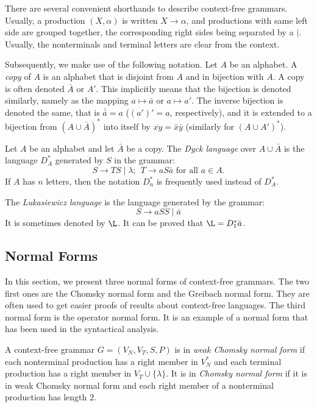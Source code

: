 There are several convenient shorthands to describe context-free grammars. Usually, a production $(X, \alpha)$ is written $X \to \alpha$, and productions with same left side are grouped together, the corresponding right sides being separated by a $\mid$. Usually, the nonterminals and terminal letters are clear from the context.

Subsequently, we make use of the following notation. Let $A$ be an alphabet. A \emph{copy} of $A$ is an alphabet that is disjoint from $A$ and in bijection with $A$. A copy is often denoted $\bar{A}$ or $A'$. This implicitly means that the bijection is denoted similarly, namely as the mapping $a \mapsto \bar{a}$ or $a \mapsto a'$. The inverse bijection is denoted the same, that is $\bar{\bar{a}} = a$ ($(a')' = a$, respectively), and it is extended to a bijection from $(A \cup \bar{A})^*$ into itself  by $\overline{xy} = \bar{x} \bar{y}$ (similarly for $(A \cup A')^*$).

Let $A$ be an alphabet and let $\bar{A}$ be a copy. The \emph{Dyck language} over $A \cup \bar{A}$ is the language $D^*_A$ generated by $S$ in the grammar: $$S \to TS \mid \lambda; \ \ T \to a S \bar{a} \text{ for all } a \in A.$$ If $A$ has $n$ letters, then the notation $D^*_n$ is frequently used instead of $D^*_A$.

The \emph{Lukasiewicz language} is the language generated by the grammar: $$S \to aSS \mid \bar{a}$$ It is sometimes denoted by ${\L}$. It can be proved that ${\L} = D^*_1 \bar{a}$.

\subsection{Normal Forms}
\label{subsection:context-free-normal-forms}

In this section, we present three normal forms of context-free grammars. The two first ones are the  Chomsky normal form and the Greibach normal form. They are often used to get easier proofs of results about context-free languages. The third normal form is the operator normal form. It is an example of a normal form that has been used in the syntactical analysis.

A context-free grammar $G = (V_N, V_T, S, P)$ is in \emph{weak Chomsky normal form} if each nonterminal production has a right member in $V_N^*$ and each terminal production has a right member in $V_T \cup \{\lambda\}$. It is in \emph{Chomsky normal form} if it is in weak Chomsky normal form and each right member of a nonterminal production has length $2$.

